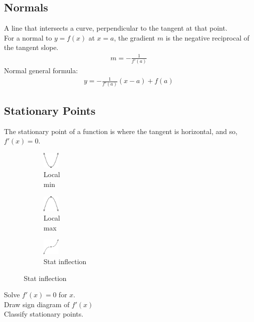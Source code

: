 \documentclass[10pt, a4paper, titlepage]{article}
\begin{document}
\begin{multicols*}{3}
	\subsection{Normals}
	A line that intersects a curve, perpendicular to the tangent at that point.\\
	For a normal to $y=f(x)$ at $x=a$, the gradient $m$ is the negative reciprocal of the tangent slope.
	\begin{align}
		m=-\frac{1}{f'(a)}
	\end{align}
	Normal general formula:
	\begin{align}
		y=-\frac{1}{f'(a)}(x-a)+f(a)
	\end{align}

	\dotfill
	\subsection{Stationary Points}
	The stationary point of a function is where the tangent is horizontal, and so, $f'(x)=0$.
	\begin{figure}[H]
		\centering
		\begin{subfigure}[b]{0.1\textwidth}
			\centering
			\includegraphics[width=0.8cm]{local_min.png}
			\caption*{Local\\min}
		\end{subfigure}
		\hfill
		\begin{subfigure}[b]{0.1\textwidth}
			\centering
			\includegraphics[width=0.8cm]{local_max.png}
			\caption*{Local\\max}
		\end{subfigure}
		\hfill
		\begin{subfigure}[b]{0.1\textwidth}
			\centering
			\includegraphics[width=0.8cm]{stat_inflection.png}
			\caption*{Stat inflection}
		\end{subfigure}
	\end{figure}
	Solve $f'(x)=0$ for $x$.\\
	Draw sign diagram of $f'(x)$\\
	Classify stationary points.\\


\end{multicols*}
\end{document}
